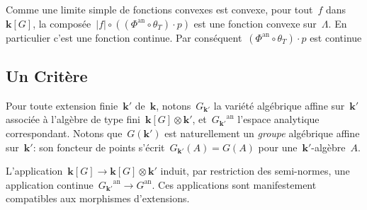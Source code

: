 \documentclass[french]{amsart}
\newcommand{\kk}{\mathbf{k}}
\newcommand{\abs}[1]{{\left|{#1}\right|}}
\newcommand{\an}{\textrm{an}}
\newcommand{\tens}{\mathop{\otimes}}
\begin{document}
Comme une limite simple de fonctions convexes est convexe, pour tout~$f$
dans~$\kk[G]$, la composée~$\abs{f}\circ((\Phi^\an\circ\theta_T )\cdot p)$ est une fonction convexe sur~$\Lambda$. En particulier c'est une fonction continue. Par conséquent~$(\Phi^\an\circ\theta_T )\cdot p$ est continue

\subsection{Un Critère}\label{sectionD5} Pour toute extension finie~$\kk'$ de~$\kk$, notons~$G_{\kk'}$ la variété algébrique affine sur~$\kk'$ associée à l'algèbre de type fini~$\kk[G]\tens\kk'$, et~${G_{\kk'}}^\an$ l'espace analytique correspondant. Notons que~$G(\kk')$ est naturellement un \emph{groupe} algébrique affine sur~$\kk'$: son foncteur de points s'écrit~$G_{\kk'}(A)=G(A)$ pour une~$\kk'$-algèbre~$A$.

L'application~$\kk[G]\to\kk[G]\tens\kk'$ induit, par restriction des semi-normes, une application continue~${G_{\kk'}}^\an\to G^\an$. Ces applications sont manifestement compatibles aux morphismes d'extensions.
\end{document}
